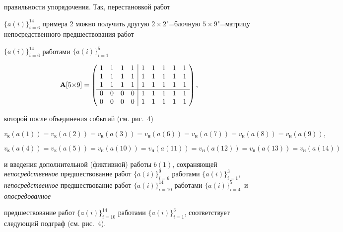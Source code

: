 правильности упорядочения. Так, перестановкой работ

$\{a(i)\}^{14}_{i=6}$ примера 2 можно получить другую $2{\times} 2$"=блочную $5{\times}9$"=матрицу непосредственного предшествования работ

$\{a(i)\}^{14}_{i=6}$ работами $\{a(i)\}^{5}_{i=1}$

\[

{\bf A}[5{\times}9]= \left(\!

\begin{array}{cccc|ccccc}

1 & 1 & 1 & 1 &  1 & 1 & 1& 1 & 1  \\

1 & 1 & 1 & 1 & 1 & 1 & 1& 1 & 1  \\

1 & 1 & 1 & 1 & 1 & 1 & 1& 1 & 1  \\

\hline

0 & 0 & 0 & 0 & 1 & 1 & 1& 1 & 1\\

0 & 0 & 0 & 0 & 1 & 1 & 1& 1 & 1

\end{array} \!\right),

\]

которой после объединения событий (см. рис.~4)

$$

v_{\text{к}}(a(1))=v_{\text{к}}(a(2)) = v_{\text{к}}(a(3))=

v_{\text{н}}(a(6)) = v_{\text{н}}(a(7))= v_{\text{н}}(a(8))=

v_{\text{н}}(a(9)),$$

$$

v_{\text{к}}(a(4))=v_{\text{к}}(a(5)) = v_{\text{н}}(a(10))=

v_{\text{н}}(a(11)) = v_{\text{н}}(a(12))= v_{\text{н}}(a(13))=

v_{\text{н}}(a(14))

$$

и введения дополнительной (фиктивной) работы $b(1)$, сохраняющей {\it непосредственное} предшествование работ $\{a(i)\}^{9}_{i=6}$ работами $\{a(i)\}^{3}_{i=1}$, {\it непосредственное} предшествование работ $\{a(i)\}^{14}_{i=10}$ работами $\{a(i)\}^{5}_{i=4}$~и {\it опосредованное}

предшествование работ $\{a(i)\}^{14}_{i=10}$  работами $\{a(i)\}^{3}_{i=1}$, соответствует следующий подграф (см. рис.~4).









